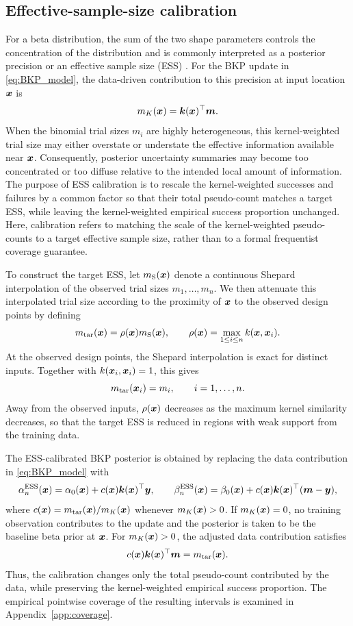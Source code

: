\documentclass[article, shortnames]{jss}
\renewcommand{\vec}[1]{\mbox{\boldmath ${#1}$}}
\begin{document}
\subsection{Effective-sample-size calibration}\label{sec:ESS}

For a beta distribution, the sum of the two shape parameters controls the concentration of the distribution and is commonly interpreted as a posterior precision or an effective sample size (ESS) \citep{Morita2008ESS}. 
For the BKP update in \eqref{eq:BKP_model}, the data-driven contribution to this precision at input location $\vec{x}$ is
\[
m_K(\vec{x}) = \vec{k}(\vec{x})^\top \vec{m}.
\]
When the binomial trial sizes $m_i$ are highly heterogeneous, this kernel-weighted trial size may either overstate or understate the effective information available near $\vec{x}$. 
Consequently, posterior uncertainty summaries may become too concentrated or too diffuse relative to the intended local amount of information.
The purpose of ESS calibration is to rescale the kernel-weighted successes and failures by a common factor so that their total pseudo-count matches a target ESS, while leaving the kernel-weighted empirical success proportion unchanged.
Here, calibration refers to matching the scale of the kernel-weighted pseudo-counts to a target effective sample size, rather than to a formal frequentist coverage guarantee.

To construct the target ESS, let $m_{\mathrm S}(\vec{x})$ denote a continuous Shepard interpolation \citep{Shepard1968} of the observed trial sizes $m_1,\ldots,m_n$. 
We then attenuate this interpolated trial size according to the proximity of $\vec{x}$ to the observed design points by defining
\[
m_{\mathrm{tar}}(\vec{x}) = \rho(\vec{x})m_{\mathrm S}(\vec{x}),
\qquad
\rho(\vec{x}) = \max_{1\le i\le n} k(\vec{x},\vec{x}_i).
\]
At the observed design points, the Shepard interpolation is exact for distinct inputs. Together with $k(\vec{x}_i,\vec{x}_i)=1$, this gives
\[
	m_{\mathrm{tar}}(\vec{x}_i)=m_i,\qquad i =1,\ldots,n.
\]
Away from the observed inputs, $\rho(\vec{x})$ decreases as the maximum kernel similarity decreases, so that the target ESS is reduced in regions with weak support from the training data.

The ESS-calibrated BKP posterior is obtained by replacing the data contribution in \eqref{eq:BKP_model} with
\[
	\alpha_n^{\mathrm{ESS}}(\vec{x}) 
	= \alpha_0(\vec{x}) + c(\vec{x})\vec{k}(\vec{x})^\top\vec{y},
	\qquad
	\beta_n^{\mathrm{ESS}}(\vec{x}) 
	= \beta_0(\vec{x}) + c(\vec{x})\vec{k}(\vec{x})^\top(\vec{m}-\vec{y}),
\]
where $c(\vec{x}) = m_{\mathrm{tar}}(\vec{x})/m_K(\vec{x})$ whenever $m_K(\vec{x})>0$. 
If $m_K(\vec{x})=0$, no training observation contributes to the update and the posterior is taken to be the baseline beta prior at $\vec{x}$. 
For $m_K(\vec{x})>0$, the adjusted data contribution satisfies
\[
	c(\vec{x})\vec{k}(\vec{x})^\top\vec{m}=m_{\mathrm{tar}}(\vec{x}).
\]
Thus, the calibration changes only the total pseudo-count contributed by the data, while preserving the kernel-weighted empirical success proportion.
The empirical pointwise coverage of the resulting intervals is examined in Appendix~\ref{app:coverage}.
\end{document}
